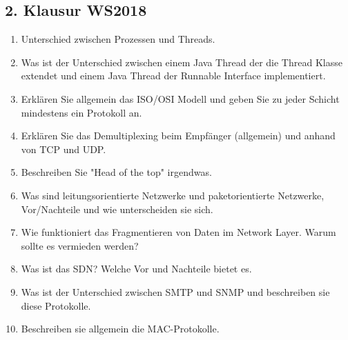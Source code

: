 \documentclass{scrartcl}
\begin{document}
    \subsection{2. Klausur WS2018}
    \begin{enumerate}
        \item Unterschied zwischen Prozessen und Threads.
        \item Was ist der Unterschied zwischen einem Java Thread der die Thread Klasse extendet und einem Java Thread der Runnable Interface implementiert.
        \item Erklären Sie allgemein das ISO/OSI Modell und geben Sie zu jeder Schicht mindestens ein Protokoll an.
        \item Erklären Sie das Demultiplexing beim Empfänger (allgemein) und anhand von TCP und UDP.
        \item Beschreiben Sie "Head of the top" irgendwas.
        \item Was sind leitungsorientierte Netzwerke und paketorientierte Netzwerke, Vor/Nachteile und wie unterscheiden sie sich.
        \item Wie funktioniert das Fragmentieren von Daten im Network Layer. Warum sollte es vermieden werden?
        \item Was ist das SDN? Welche Vor und Nachteile bietet es.
        \item Was ist der Unterschied zwischen SMTP und SNMP und beschreiben sie diese Protokolle.
        \item Beschreiben sie allgemein die MAC-Protokolle.
    \end{enumerate}
\end{document}
